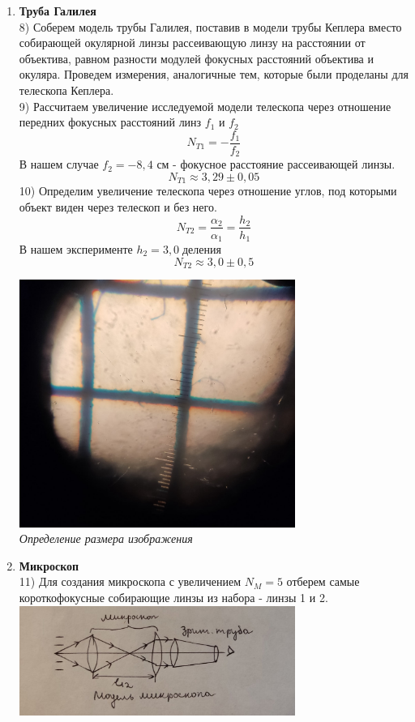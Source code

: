 \documentclass[a4paper]{article}
\begin{document}
\begin{multicols}{2}
\begin{enumerate}
\begin{enumerate}
\item \textbf{Труба Галилея}\\
8) Соберем модель трубы Галилея, поставив в модели трубы Кеплера вместо собирающей окулярной линзы рассеивающую линзу на расстоянии от объектива, равном разности модулей фокусных расстояний объектива и окуляра. Проведем измерения, аналогичные тем, которые были проделаны для телескопа Кеплера.\\
9) Рассчитаем увеличение исследуемой модели телескопа через отношение передних фокусных расстояний линз $f_1$ и $f_2$
$$N_{T1} = - \frac{f_1}{f_2}$$
В нашем случае $f_2 = - 8,4$ см - фокусное расстояние рассеивающей линзы.\\
$$N_{T1} \approx 3,29 \pm 0,05$$
10) Определим увеличение телескопа через отношение углов, под которыми объект виден через телескоп и без него.\\
$$N_{T2} =  \frac{\alpha_2}{\alpha_1} =  \frac{h_2}{h_1}$$
В нашем эксперименте $h_2 = 3,0 \; \textit{деления}$
$$N_{T2} \approx  3,0 \pm 0,5$$
\begin{center}
\includegraphics[width=9cm]{exp2}\\
\textit{Определение размера изображения }
\end{center}
\item \textbf{Микроскоп}\\
11) Для создания микроскопа с увеличением $N_{M} = 5$ отберем самые короткофокусные собирающие линзы из набора - линзы 1 и 2.\\
\includegraphics[width=9cm]{exp6}\\

\end{enumerate}
\end{enumerate}
\end{multicols}
\end{document}

